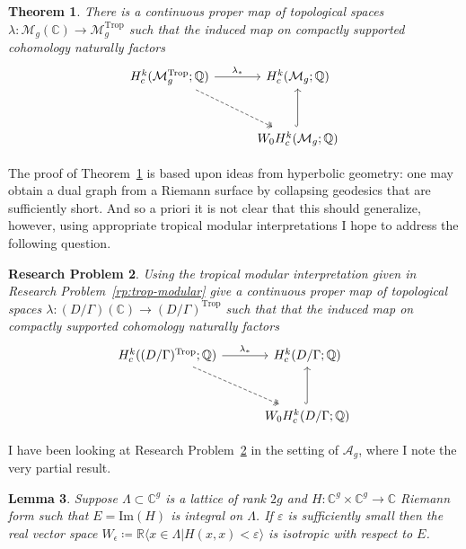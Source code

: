 \documentclass[11pt,reqno]{amsart}
\newtheorem{lemma}{Lemma}[section]
\newtheorem{theorem}[lemma]{Theorem}
\newtheorem{problem}[lemma]{Research Problem}
\theoremstyle{remark}
\newcommand{\CC}{\mathbb{C}}
\newcommand{\QQ}{\mathbb{Q}}
\newcommand{\RR}{\mathbb{R}}
\newcommand{\cA}{\mathcal{A}}
\DeclareMathOperator{\Trop}{Trop}
\begin{document}
\begin{theorem}\cite[Section 7]{CGP21} \label{thm:cpg-lambda}
There is a continuous proper map of topological spaces $\lambda: \mathcal{M}_{g}(\CC)\to \mathcal{M}_{g}^{\Trop}$ such that the induced map on compactly supported cohomology naturally factors
\[
\begin{tikzcd}[row sep = 3em, column sep = 3em]
H_{c}^{k}( \mathcal{M}_{g}^{\Trop}; \QQ) \arrow[r, "\lambda_{*}"] \arrow[dr, two heads,dashed] & H^{k}_{c}(\mathcal{M}_{g}; \QQ) \\
& W_{0}H^{k}_{c}(\mathcal{M}_{g}; \QQ) \arrow[u, hook]
\end{tikzcd}
\]
\end{theorem}

The proof of Theorem~\ref{thm:cpg-lambda} is based upon ideas from hyperbolic geometry: one may obtain a dual graph from a Riemann surface by collapsing geodesics that are sufficiently short. And so a priori it is not clear that this should generalize, however, using appropriate tropical modular interpretations I hope to address the following question. 


\begin{problem}\label{rp:lambda}
Using the tropical modular interpretation given in Research Problem~\ref{rp:trop-modular} give a continuous proper map of topological spaces $\lambda:(D/\Gamma)(\CC)\to(D/\Gamma)^{\Trop}$ such that that the induced map on compactly supported cohomology naturally factors
\[
\begin{tikzcd}[row sep = 3em, column sep = 3em]
H_{c}^{k}( (D/\Gamma)^{\Trop}; \QQ) \arrow[r, "\lambda_{*}"] \arrow[dr, two heads,dashed] & H^{k}_{c}(D/\Gamma; \QQ) \\
& W_{0}H^{k}_{c}(D/\Gamma; \QQ) \arrow[u, hook]
\end{tikzcd}
\]
\end{problem}

I have been looking at Research Problem~\ref{rp:lambda} in the setting of $\cA_{g}$, where I note the very partial result. 

\begin{lemma}\label{lem:eps}
Suppose $\Lambda \subset \CC^{g}$ is a lattice of rank $2g$ and $H:\CC^{g}\times \CC^{g}\to \CC$ Riemann form such that $E=\text{Im}(H)$ is integral on $\Lambda$. If $\varepsilon$ is sufficiently small then the real vector space $W_{\epsilon}\coloneqq \RR\langle x\in \Lambda | H(x,x)< \varepsilon\rangle$ is isotropic with respect to $E$.
\end{lemma}
\end{document}
